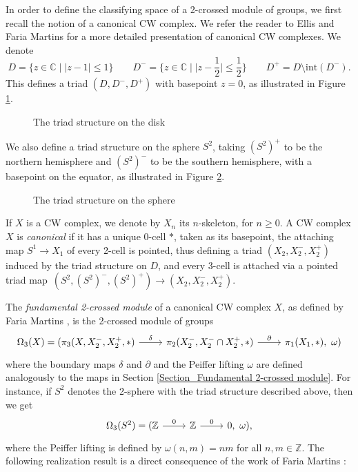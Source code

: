 \documentclass[a4paper, oneside]{amsart}
\newcommand{\Z}{\mathbb{Z}}
\numberwithin{equation}{subsection}
\theoremstyle{referencedlemma}
\theoremstyle{plain} %
\theoremstyle{remark}
\begin{document}
In order to define the classifying space of a 2-crossed module of groups, we first recall the notion of a canonical CW complex.  We refer the reader to Ellis \cite{ellis_crossed_1993} and Faria Martins \cite{martins_fundamental_2011} for a more detailed presentation of canonical CW complexes.  We denote
$$
D = \{z\in \mathbb{C} \mid \lvert z - 1 \rvert \leqslant 1\}\quad \quad D^- = \{z\in \mathbb{C} \mid \lvert z - \frac{1}{2}\rvert \leqslant \frac{1}{2}\} \quad \quad D^+ = D \setminus \mathrm{int}(D^-).
$$
This defines a triad $(D, D^-, D^+)$ with basepoint $z = 0$, as illustrated in Figure \ref{fig:disk triad}.

\begin{figure}[h]
\centering

\caption{The triad structure on the disk}
\label{fig:disk triad}
\end{figure}

We also define a triad structure on the sphere $S^2$, taking $(S^2)^+$ to be the northern hemisphere and $(S^2)^-$ to be the southern hemisphere, with a basepoint on the equator, as illustrated in Figure \ref{fig:sphere triad}. 

\begin{figure}[h]
\centering

\caption{The triad structure on the sphere}
\label{fig:sphere triad}
\end{figure}

If $X$ is a CW complex, we denote by $X_n$ its $n$-skeleton, for $n\geqslant 0$. A CW complex $X$ is \emph{canonical} if it has a unique 0-cell $*$, taken as its basepoint, the attaching map $S^1 \to X_1$ of every 2-cell is pointed, thus defining a triad $(X_2, X_2^-, X_2^+)$ induced by the triad structure on $D$, and every 3-cell is attached via a pointed triad map~$(S^2, (S^2)^-, (S^2)^+) \to (X_2, X_2^-, X_2^+)$. 

The \emph{fundamental 2-crossed module} of a canonical CW complex $X$, as defined by Faria Martins \cite{martins_fundamental_2011}, is the 2-crossed module of groups
$$
\begin{tikzcd}
\Omega_3(X) = (\pi_3(X, X_2^-, X_2^+, *) \arrow[r, "\delta"] & \pi_2(X_2^-, X_2^-\cap X_2^+, *) \arrow[r, "\partial"]& \pi_1(X_1, *), \ \omega)
\end{tikzcd}
$$
where the boundary maps $\delta$ and $\partial$ and the Peiffer lifting $\omega$ are defined analogously to the maps in Section \ref{Section_Fundamental 2-crossed module}. For instance, if $S^2$ denotes the 2-sphere with the triad structure described above, then we get
$$
\begin{tikzcd}
\Omega_3(S^2) = (\Z \arrow[r, "0"] & \Z \arrow[r, "0"] & 0, \ \omega),
\end{tikzcd}
$$
where the Peiffer lifting is defined by $\omega(n,m) = nm$ for all $n,m \in \Z$.  The following realization result is a direct consequence of the work of Faria Martins \cite{martins_fundamental_2011}:
\end{document}
